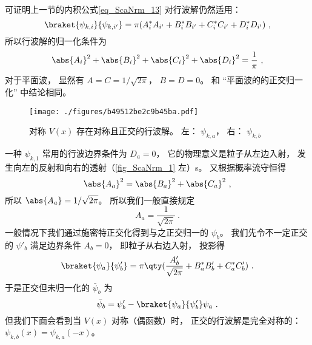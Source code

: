 可证明上一节的内积公式\autoref{eq_ScaNrm_13} 对行波解仍然适用：
\begin{equation}
\braket{\psi_{k,i}}{\psi_{k,i'}} = \pi (A_i^* A_{i'} + B_i^* B_{i'} + C_i^* C_{i'} + D_i^* D_{i'})~,
\end{equation}
所以行波解的归一化条件为
\begin{equation}
\abs{A_i}^2 + \abs{B_i}^2 + \abs{C_i}^2 + \abs{D_i}^2= \frac{1}{\pi}~,
\end{equation}
对于平面波， 显然有 $A = C = 1/\sqrt{2\pi}$， $B = D = 0$。 和 “平面波的的正交归一化” 中结论相同。

\begin{figure}[ht]
\centering
\texttt{[image: ./figures/b49512be2c9b45ba.pdf]}
\caption{对称 $V(x)$ 存在对称且正交的行波解。 左： $\psi_{k,a}$， 右： $\psi_{k,b}$} \label{fig_ScaNrm_1}
\end{figure}

一种 $\psi_{k,1}$ 常用的行波边界条件为 $D_a = 0$， 它的物理意义是粒子从左边入射， 发生向左的反射和向右的透射（\autoref{fig_ScaNrm_1} 左）s。 又根据概率流守恒得
\begin{equation}
\abs{A_a}^2 = \abs{B_a}^2 + \abs{C_a}^2~,
\end{equation}
所以 $\abs{A_a} = 1/\sqrt{2\pi}$。 所以我们一般直接规定
\begin{equation}\label{eq_ScaNrm_10}
A_a = \frac{1}{\sqrt{2\pi}}~.
\end{equation}
一般情况下我们通过施密特正交化得到与之正交归一的 $\psi_b$。 我们先令不一定正交的 $\psi'_b$ 满足边界条件 $A_b = 0$， 即粒子从右边入射， 投影得
\begin{equation}
\braket{\psi_a}{\psi'_b} = \pi \qty(\frac{A'_b}{\sqrt{2\pi}} + B_a^* B'_b + C_a^*C'_b)~.
\end{equation}
于是正交但未归一化的 $\bar\psi_b$ 为
\begin{equation}
\bar\psi_b = \psi'_b - \braket{\psi_a}{\psi'_b}\psi_a~.
\end{equation}
但我们下面会看到当 $V(x)$ 对称（偶函数）时， 正交的行波解是完全对称的： $\psi_{k,b}(x) = \psi_{k,a}(-x)$。

